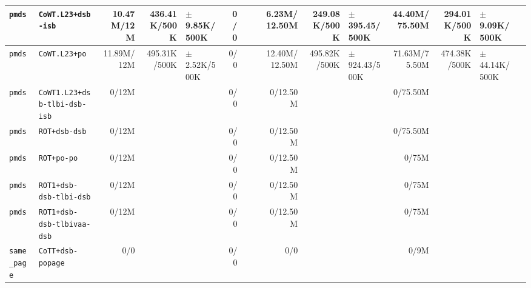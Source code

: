 \begin{tabular}{l l  | r r l | r r l | r r l | r r l l}
           \verb|pmds| &                                    \verb|CoWT.L23+dsb-isb| &     10.47M/12M &          436.41K/500K &  $\pm$ 9.85K/500K &            0/0 &                       &  &   6.23M/12.50M &          249.08K/500K & $\pm$ 395.45/500K &  44.40M/75.50M &          294.01K/500K &  $\pm$ 9.09K/500K & \\ \hline 
           \verb|pmds| &                                         \verb|CoWT.L23+po| &     11.89M/12M &          495.31K/500K &  $\pm$ 2.52K/500K &            0/0 &                       &  &  12.40M/12.50M &          495.82K/500K & $\pm$ 924.43/500K &  71.63M/75.50M &          474.38K/500K & $\pm$ 44.14K/500K & \\ \hline 
           \verb|pmds| &                          \verb|CoWT1.L23+dsb-tlbi-dsb-isb| &          0/12M &                       &                   &            0/0 &                       &  &       0/12.50M &                       &                   &       0/75.50M &                       &                   & \\ \hline 
           \verb|pmds| &                                         \verb|ROT+dsb-dsb| &          0/12M &                       &                   &            0/0 &                       &  &       0/12.50M &                       &                   &       0/75.50M &                       &                   & \\ \hline 
           \verb|pmds| &                                           \verb|ROT+po-po| &          0/12M &                       &                   &            0/0 &                       &  &       0/12.50M &                       &                   &          0/75M &                       &                   & \\ \hline 
           \verb|pmds| &                               \verb|ROT1+dsb-dsb-tlbi-dsb| &          0/12M &                       &                   &            0/0 &                       &  &       0/12.50M &                       &                   &          0/75M &                       &                   & \\ \hline 
           \verb|pmds| &                            \verb|ROT1+dsb-dsb-tlbivaa-dsb| &          0/12M &                       &                   &            0/0 &                       &  &       0/12.50M &                       &                   &          0/75M &                       &                   & \\ \hline 
      \verb|same_page| &                                     \verb|CoTT+dsb-popage| &            0/0 &                       &                   &            0/0 &                       &  &            0/0 &                       &                   &           0/9M &                       &                   & \\ \hline 

\end{tabular}
